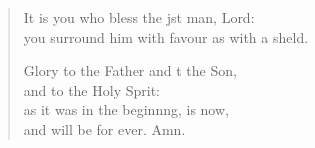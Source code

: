 \begin{verse}
\begin{patverse}
It is you who bless the jst man, Lord:\Med\\
    you surround him with favour as with a sh\pointup{\i}eld.

Glory to the Father and t the Son,\Med\\
    and to the Holy Sp\pointup{\i}rit:\\
as it was in the beginn\pointup{\i}ng, is now,\Med\\
    and will be for ever. Amn.
  \end{patverse}
\end{verse}
